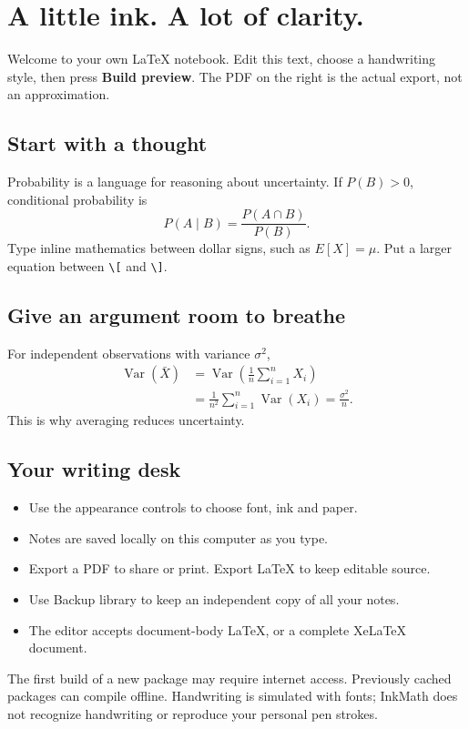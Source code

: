 \section*{A little ink. A lot of clarity.}
Welcome to your own LaTeX notebook. Edit this text, choose a handwriting
style, then press \textbf{Build preview}. The PDF on the right is the actual
export, not an approximation.

\subsection*{Start with a thought}
Probability is a language for reasoning about uncertainty.
If $P(B)>0$, conditional probability is
\[
P(A\mid B)=\frac{P(A\cap B)}{P(B)}.
\]
Type inline mathematics between dollar signs, such as $E[X]=\mu$.
Put a larger equation between \verb|\[| and \verb|\]|.

\subsection*{Give an argument room to breathe}
For independent observations with variance $\sigma^2$,
\begin{align*}
\operatorname{Var}(\bar X)
&=\operatorname{Var}\left(\frac1n\sum_{i=1}^nX_i\right)\\
&=\frac1{n^2}\sum_{i=1}^n\operatorname{Var}(X_i)
=\frac{\sigma^2}{n}.
\end{align*}
This is why averaging reduces uncertainty.

\subsection*{Your writing desk}
\begin{itemize}
\item Use the appearance controls to choose font, ink and paper.
\item Notes are saved locally on this computer as you type.
\item Export a PDF to share or print. Export LaTeX to keep editable source.
\item Use Backup library to keep an independent copy of all your notes.
\item The editor accepts document-body LaTeX, or a complete XeLaTeX document.
\end{itemize}
The first build of a new package may require internet access. Previously
cached packages can compile offline. Handwriting is simulated with fonts;
InkMath does not recognize handwriting or reproduce your personal pen strokes.
